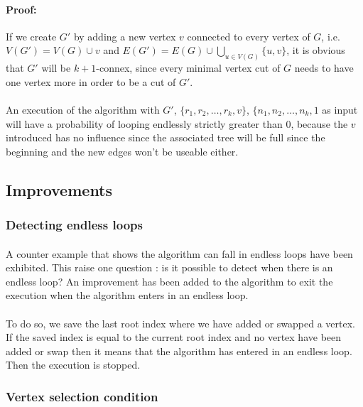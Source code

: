 \paragraph{Proof:}
If we create $G'$ by adding a new vertex $v$ connected to every vertex of $G$,
i.e. $V(G') = V(G) \cup v$ and
$E(G') = E(G) \cup \bigcup \limits_{u \in V(G)} \{u,v\}$, it is obvious that
$G'$ will be $k+1$-connex, since every minimal vertex cut of $G$ needs to have
 one vertex more in order to be a cut of $G'$.

\paragraph{}
An execution of the algorithm with $G'$, $\{r_1,r_2, \dots, r_k, v\}$,
$\{n_1,n_2, \dots, n_k, 1$ as input will have a probability of looping
endlessly strictly greater than $0$, because the $v$ introduced has no influence
since the associated tree will be full since the beginning and the new edges
won't be useable either.
\subsection{Improvements}
\subsubsection{Detecting endless loops}
\paragraph{}
A counter example that shows the algorithm can fall in endless loops have been
exhibited. This raise one question : is it possible to detect when there is an
endless loop? An improvement has been added to the algorithm to exit the
execution when the algorithm enters in an endless loop.

\paragraph{}
To do so, we save the last root index where we have added or swapped a vertex. If
the saved index is equal to the current root index and no vertex have been
added or swap then it means that the algorithm has entered in an endless loop. Then
the execution is stopped.

\subsubsection{Vertex selection condition}
